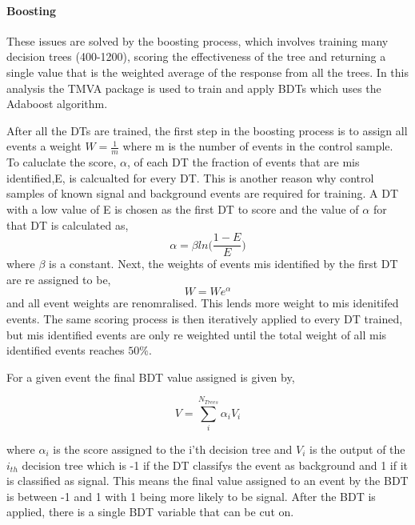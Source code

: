 \paragraph{Boosting}
These issues are solved by the boosting process, which involves training many decision trees (400-1200), scoring the effectiveness of the tree and returning a single value that is the weighted average of the response from all the trees.  In this analysis the TMVA package is used to train and apply BDTs which uses the Adaboost algorithm\cite{Hocker:2007ht}. 

After all the DTs are trained, the first step in the boosting process is to assign all events a weight $W=\frac{1}{m}$ where m is the number of events in the control sample.  To caluclate the score, $\alpha$, of each DT the fraction of events that are mis identified,E, is calcualted for every DT. This is another reason why control samples of known signal and background events are required for training.  A DT with a low value of E is chosen as the first DT to score and the value of $\alpha$ for that DT is calculated as,
\begin{equation}
  \alpha=\beta ln\big(\frac{1-E}{E}\big)
\end{equation}
where $\beta$ is a constant.  Next, the weights of events mis identified by the first DT are re assigned to be,
\begin{equation}
  W=W e^{\alpha}
\end{equation}
and all event weights are renomralised.  This lends more weight to mis idenitifed events. The same scoring process is then iteratively applied to every DT trained, but mis identified events are only re weighted until the total weight of all mis identified events reaches $50\%$. 

For a given event the final BDT value assigned is given by,

\begin{equation}
  V=\sum \limits_{i}^{N_{Trees}}\alpha_iV_i
\end{equation}

where $\alpha_i$ is the score assigned to the i'th decision tree and $V_i$ is the output of the $i_{th}$ decision tree which is -1 if the DT classifys the event as background and 1 if it is classified as signal.  This means the final value assigned to an event by the BDT is between -1 and 1 with 1 being more likely to be signal.  After the BDT is applied, there is a single BDT variable that can be cut on.

